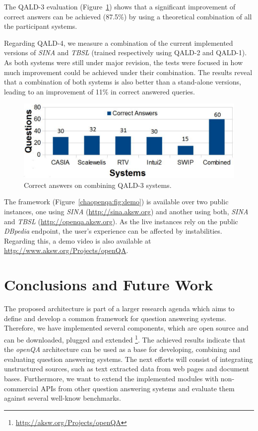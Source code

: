 \vspace{-4.0mm}
The QALD-3 evaluation (Figure~\ref{chaopenqa:fig:combining}) shows that a significant improvement of correct answers can be achieved (87.5\%) by using a theoretical combination of all the participant systems.

Regarding QALD-4, we measure a combination of the current implemented versions of \emph{SINA} and \emph{TBSL} (trained respectively using QALD-2 and QALD-1). 
As both systems were still under major revision, the tests were focused in how much improvement could be achieved under their combination. 
The results reveal that a combination of both systems is also better than a stand-alone versions, leading to an improvement of 11\% in correct answered queries.

\begin{figure}[h]
	\centering
	\includegraphics[width=\columnwidth]{chapter_four/SEMANTiCS_openQA/images/right_answers.pdf}	
	\caption{Correct answers on combining QALD-3 systems.}
	\label{chaopenqa:fig:combining}
\end{figure}

The framework (Figure~\ref{chaopenqa:fig:demo}) is available over two public instances,
one using \emph{SINA} (\url{http://sina.aksw.org}) and another using both, \emph{SINA} and \emph{TBSL} (\url{http://openqa.aksw.org}).
As the live instances rely on the public \emph{DBpedia} endpoint, the user's experience can be affected by instabilities.
Regarding this, a demo video is also available at \url{http://www.aksw.org/Projects/openQA}.

\vspace{8.0mm}
\section{Conclusions and Future Work}
\label{chaopenqa:sec:conc}

The proposed architecture is part of a larger research agenda which aims to define and develop a common framework for question answering systems.
Therefore, we have implemented several components, which are open source and can be downloaded, plugged and extended \footnote{\url{http://aksw.org/Projects/openQA}}.
The achieved results indicate that the \emph{openQA} architecture can be used as a base for developing, combining and evaluating question answering systems.
The next efforts will consist of integrating unstructured sources, such as text extracted data from web pages and document bases.
Furthermore, we want to extend the implemented modules with non-commercial APIs from other question answering systems and evaluate them against several well-know benchmarks. 

%
%
%

